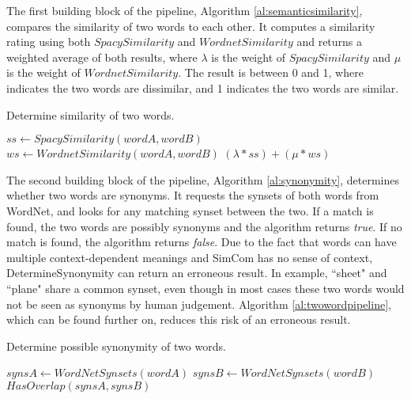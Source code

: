 \documentclass{article}
\begin{document}
The first building block of the pipeline, Algorithm \ref{al:semanticsimilarity}, compares the similarity of two words to each other. It computes a similarity rating using both $\textit{SpacySimilarity}$ and $\textit{WordnetSimilarity}$ and returns a weighted average of both results, where $\lambda$ is the weight of $\textit{SpacySimilarity}$ and $\mu$ is the weight of $\textit{WordnetSimilarity}$. The result is between 0 and 1, where indicates the two words are dissimilar, and 1 indicates the two words are similar.

\begin{algorithm}
\caption{Determine similarity of two words.}\label{al:semanticsimilarity}
\begin{algorithmic}[1]
		\State $\textit{ss} \gets \textit{SpacySimilarity}(wordA, wordB)$
		\State $\textit{ws} \gets \textit{WordnetSimilarity}(wordA, wordB)$
		\State \Return $(\lambda*ss)+(\mu*ws)$
	\EndProcedure
\end{algorithmic}
\end{algorithm}

The second building block of the pipeline, Algorithm \ref{al:synonymity}, determines whether two words are synonyms. It requests the synsets of both words from WordNet, and looks for any matching synset between the two. If a match is found, the two words are possibly synonyms and the algorithm returns \textit{true}. If no match is found, the algorithm returns \textit{false}. Due to the fact that words can have multiple context-dependent meanings and SimCom has no sense of context, DetermineSynonymity can return an erroneous result. In example, ``sheet" and ``plane" share a common synset, even though in most cases these two words would not be seen as synonyms by human judgement. Algorithm \ref{al:twowordpipeline}, which can be found further on, reduces this risk of an erroneous result.

\begin{algorithm}
\caption{Determine possible synonymity of two words.}\label{al:synonymity}
\begin{algorithmic}[1]
		\State $\textit{synsA} \gets \textit{WordNetSynsets}(wordA)$
		\State $\textit{synsB} \gets \textit{WordNetSynsets}(wordB)$
		\State \Return $\textit{HasOverlap}(synsA, synsB)$
	\EndProcedure
\end{algorithmic}
\end{algorithm}
\end{document}
